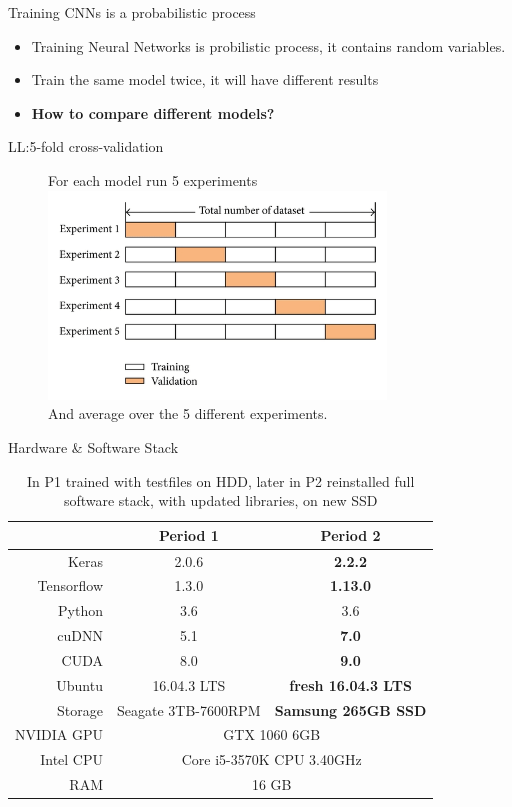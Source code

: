 \documentclass{beamer}
\begin{document}
\begin{frame}{Training CNNs is a probabilistic process}
\begin{itemize}
 \item Training Neural Networks is probilistic process, it contains random variables. 
 \item Train the same model twice, it will have different results 
 \item \textbf{How to compare different models?}
\end{itemize}
\end{frame}

\begin{frame}{LL:5-fold cross-validation}
\begin{figure}
For each model run 5 experiments
\includegraphics[width=0.8\textwidth]{5foldCV} \\
And average over the 5 different experiments. 
\end{figure}
\end{frame}

\begin{frame}{Hardware \& Software Stack}
\begin{table}
\begin{tabular}{r|cc}
& Period 1 & Period 2 \\ \hline
Keras &  2.0.6 & \textbf{2.2.2} \\
Tensorflow & 1.3.0 & \textbf{1.13.0} \\
Python & 3.6 & 3.6 \\
cuDNN & 5.1 & \textbf{7.0} \\ 
CUDA & 8.0 & \textbf{9.0} \\
Ubuntu & 16.04.3 LTS & \textbf{fresh 16.04.3 LTS} \\
Storage & Seagate 3TB-7600RPM & \textbf{Samsung 265GB SSD} \\
NVIDIA GPU & \multicolumn{2}{c}{GTX 1060 6GB} \\
Intel CPU &  \multicolumn{2}{c}{Core i5-3570K CPU \@ 3.40GHz} \\
RAM & \multicolumn{2}{c}{16 GB} \\
\end{tabular}
\caption{In P1 trained with testfiles on HDD, later in P2 reinstalled full software stack, with updated libraries, on new SSD}
\end{table}
\end{frame}
\end{document}
